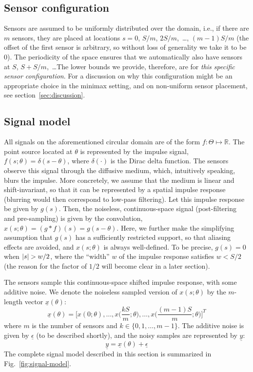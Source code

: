 \documentclass[conference]{IEEEtran}
\providecommand{\v}{}
\renewcommand{\v}[1]{\underline{#1}}
\DeclarePairedDelimiter\abs{\lvert}{\rvert}
\begin{document}
\subsection{Sensor configuration}

Sensors are assumed to be uniformly distributed over the domain, i.e., if there
are $m$ sensors, they are placed at locations $s = 0$, $S/m$, $2S/m$,~\dots,
$(m{-}1)S/m$ (the offset of the first sensor is arbitrary, so without loss of
generality we take it to be 0). The periodicity of the space ensures that we
automatically also have sensors at $S$, $S{+}S/m$,~\dots\@ The lower bounds we
provide, therefore, are for \emph{this specific sensor configuration}. For a
discussion on why this configuration might be an appropriate choice in the
minimax setting, and on non-uniform sensor placement, see
section~\ref{sec:discussion}.

\subsection{Signal model}
\label{sec:signal-model}

All signals on the aforementioned circular domain are of the form
$f:\Theta\mapsto\mathbb{R}$.  The point source located at $\theta$ is
represented by the impulse signal, $f(s;\theta) = \delta(s - \theta)$, where
$\delta(\cdot)$ is the Dirac delta function.  The sensors observe this signal
through the diffusive medium, which, intuitively speaking, blurs the impulse.
More concretely, we assume that the medium is linear and shift-invariant, so
that it can be represented by a spatial impulse response (blurring would then
correspond to low-pass filtering). Let this impulse response be given by
$g(s)$. Then, the noiseless, continuous-space signal (post-filtering and
pre-sampling) is given by the convolution, $x(s; \theta) = (g*f)(s) = g(s -
\theta)$. Here, we further make the simplifying assumption that $g(s)$ has a
sufficiently restricted support, so that aliasing effects are avoided, and
$x(s; \theta)$ is always well-defined. To be precise, $g(s) = 0$ when $\abs{s}
> w/2$, where the ``width'' $w$ of the impulse response satisfies $w < S / 2$
(the reason for the factor of $1/2$ will become clear in a later section).

The sensors sample this continuous-space shifted impulse response, with some
additive noise. We denote the noiseless sampled version of $x(s; \theta)$ by
the $m$-length vector $\v x(\theta)$:
\begin{equation} \label{eq:sampled-signal}
	\v x(\theta) = \bigg[x(0; \theta), \ldots, x\Big(\frac{kS}{m}; \theta\Big), \ldots, x\Big(\frac{(m-1)S}{m}; \theta\Big)\bigg]^T
\end{equation}
where $m$ is the number of sensors and $k \in \{0, 1, \ldots, m-1\}$. The
additive noise is given by $\v \epsilon$ (to be described shortly), and the
noisy samples are represented by $\v y$:
\begin{equation} \label{eq:sensor-obs}
	\v y = \v x(\theta) + \v \epsilon
\end{equation}
The complete signal model described in this section is summarized in
Fig.~\ref{fig:signal-model}.
\end{document}
